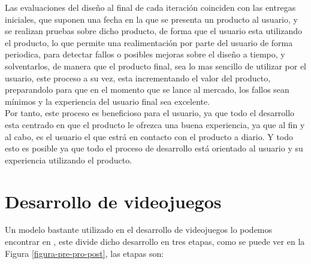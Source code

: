 Las evaluaciones del diseño al final de cada iteración coinciden con las entregas iniciales, que suponen una fecha en la que se presenta un producto al usuario, y se realizan pruebas sobre dicho producto, de forma que el usuario esta utilizando el producto, lo que permite una realimentación por parte del usuario de forma periodica, para detectar fallos o posibles mejoras sobre el diseño a tiempo, y solventarlos, de manera que el producto final, sea lo mas sencillo de utilizar por el usuario, este proceso a su vez, esta incrementando el valor del producto, preparandolo para que en el momento que se lance al mercado, los fallos sean mínimos y la experiencia del usuario final sea excelente.\\

Por tanto, este proceso es beneficioso para el usuario, ya que todo el desarrollo esta centrado en que el producto le ofrezca una buena experiencia, ya que al fin y al cabo, es el usuario el que estrá en contacto con el producto a diario. Y todo esto es posible ya que todo el proceso de desarrollo está orientado al usuario y su experiencia utilizando el producto.

\section{Desarrollo de videojuegos}
Un modelo bastante utilizado en el desarrollo de videojuegos lo podemos encontrar en \cite{pereira}, este divide dicho desarrollo en tres etapas, como se puede ver en la Figura \ref{figura-pre-pro-post}, las etapas son:

